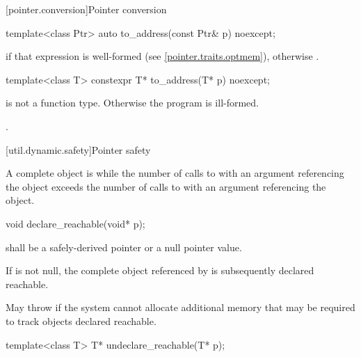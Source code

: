[pointer.conversion]{Pointer conversion}

%
\begin{itemdecl}
template<class Ptr> auto to_address(const Ptr& p) noexcept;
\end{itemdecl}

\begin{itemdescr}
\pnum
\returns
{} if that expression is well-formed
(see \ref{pointer.traits.optmem}),
otherwise .
\end{itemdescr}

%
\begin{itemdecl}
template<class T> constexpr T* to_address(T* p) noexcept;
\end{itemdecl}

\begin{itemdescr}
\pnum
\requires {} is not a function type. Otherwise the program is ill-formed.

\pnum
\returns {}.
\end{itemdescr}

[util.dynamic.safety]{Pointer safety}

\pnum
A complete object is  while the number of calls to
 with an argument referencing the object exceeds the
number of calls to  with an argument referencing the
object.

%
\begin{itemdecl}
void declare_reachable(void* p);
\end{itemdecl}

\begin{itemdescr}
\pnum
\requires {} shall be a safely-derived
pointer or a null pointer value.

\pnum
\effects If  is not null, the complete object referenced by 
is subsequently declared reachable.

\pnum
\throws May throw  if the system cannot allocate
additional memory that may be required to track objects declared reachable.
\end{itemdescr}

%
\begin{itemdecl}
template<class T> T* undeclare_reachable(T* p);
\end{itemdecl}

